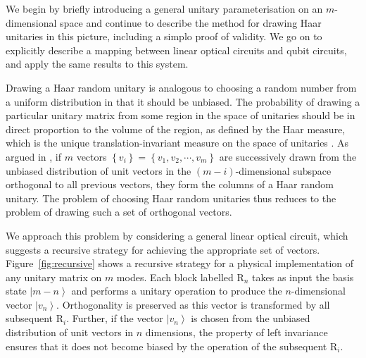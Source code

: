 \documentclass[aps,prl,twocolumn,floatfix]{revtex4}
\newcommand{\mat}[1]{\mathrm{#1}}
\newcommand{\ket}[1]{\left|#1\right\rangle}
\begin{document}
We begin by briefly introducing a general unitary parameterisation on an
\(m\)-dimensional space and continue to describe the method for drawing Haar
unitaries in this picture, including a simplo proof of validity. We go on to
explicitly describe a mapping between linear optical circuits and qubit
circuits, and apply the same results to this system.

Drawing a Haar random unitary is analogous to choosing a random number from a
uniform distribution in that it should be unbiased. The probability of drawing
a particular unitary matrix from some region in the space of unitaries should
be in direct proportion to the volume of the region, as defined by the Haar
measure, which is the unique translation-invariant measure on the space of
unitaries \cite{re-phd}. As argued in \cite{re-phd}, if \(m\) vectors \(\left\{
v_{i} \right\} = \left\{ v_{1}, v_{2}, \cdots, v_{m} \right\}\) are successively
drawn from the unbiased distribution of unit vectors in the
\(\left(m-i\right)\)-dimensional subspace orthogonal to all previous vectors,
they form the columns of a Haar random unitary. The problem of choosing Haar
random unitaries thus reduces to the problem of drawing such a set of orthogonal
vectors.

We approach this problem by considering a general linear optical circuit, which
suggests a recursive strategy for achieving the appropriate set of vectors.
Figure~\ref{fig:recursive} shows a recursive strategy for a physical
implementation
of any unitary matrix on \(m\) modes. Each block labelled \(\mat{R}_{n}\) takes
as input the basis state \( \ket{m-n}\) and performs a unitary operation to
produce the \(n\)-dimensional vector \(\ket{v_n}\). Orthogonality is preserved
as this vector is transformed by all subsequent \(\mat{R}_{i}\). Further, if the
vector \(\ket{v_{n}}\) is chosen from the unbiased distribution of unit vectors
in \(n\) dimensions, the property of left invariance ensures that it does not
become biased by the operation of the subsequent \(\mat{R}_{i}\).
\end{document}
